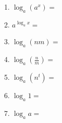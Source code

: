 \documentclass[12pt]{article}
\begin{document}
\begin{tcolorbox}
\begin{multicols}{3}
\begin{enumerate}[itemsep=.6cm]
\item $\log_{a}(a^x)=$

\item $a^{\log_{a}x}=$


\item $\log_a(nm)=$

\item $\log_a(\frac{n}{m})=$

\item  $\log_a(n^t)=$

\item $\log_a 1=$

\item $\log_a a=$

\end{enumerate}
\end{multicols}
\end{tcolorbox}
\end{document}
